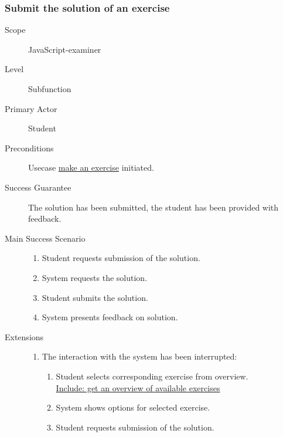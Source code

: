 \subsubsection{Submit the solution of an exercise}
\begin{mdframed} [rightmargin=-100pt]
\begin{description}
  \item[Scope] JavaScript-examiner
  \item[Level] Subfunction
  \item[Primary Actor] Student
  \item[Preconditions] Usecase \underline{make an exercise} initiated.
  \item[Success Guarantee] The solution has been submitted, the student has been
    provided with feedback.
  \item[Main Success Scenario] \mbox{}
    \begin{enumerate}
		\item Student requests submission of the solution.
		\item System requests the solution.
		\item Student submits the solution.
		\item System presents feedback on solution.
    \end{enumerate} 
  \item[Extensions] \mbox{}
	\begin{enumerate}
      \renewcommand{\labelenumi}{\theenumi a.}
	  \item The interaction with the system has been interrupted:
		\begin{enumerate}[(1)]
		  \renewcommand{\labelenumii}{\theenumii .}
		  \item Student selects corresponding exercise from overview. \\
		    \underline{Include: get an overview of available exercises}
		  \item System shows options for selected exercise.
		  \item Student requests submission of the solution.
		\end{enumerate}
	\end{enumerate}
\end{description}
\end{mdframed}